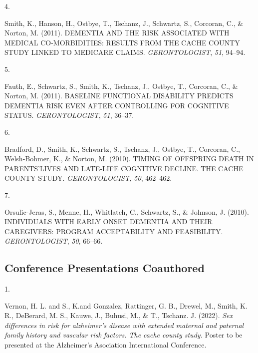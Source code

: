 \documentclass[11pt,a4paper,]{moderncv}
\newlength{\csllabelwidth}
\newcommand{\CSLLeftMargin}[1]{\parbox[t]{\csllabelwidth}{#1}}
\newcommand{\CSLRightInline}[1]{\parbox[t]{\linewidth - \csllabelwidth}{#1}}
\begin{document}
\leavevmode{}%
\CSLLeftMargin{4. }
\CSLRightInline{Smith, K., Hanson, H., Ostbye, T., Tschanz, J.,
Schwartz, S., Corcoran, C., \& Norton, M. (2011). DEMENTIA AND THE RISK
ASSOCIATED WITH MEDICAL CO-MORBIDITIES: RESULTS FROM THE CACHE COUNTY
STUDY LINKED TO MEDICARE CLAIMS. \emph{GERONTOLOGIST}, \emph{51},
94--94.}

\leavevmode{}%
\CSLLeftMargin{5. }
\CSLRightInline{Fauth, E., Schwartz, S., Smith, K., Tschanz, J., Ostbye,
T., Corcoran, C., \& Norton, M. (2011). BASELINE FUNCTIONAL DISABILITY
PREDICTS DEMENTIA RISK EVEN AFTER CONTROLLING FOR COGNITIVE STATUS.
\emph{GERONTOLOGIST}, \emph{51}, 36--37.}

\leavevmode{}%
\CSLLeftMargin{6. }
\CSLRightInline{Bradford, D., Smith, K., Schwartz, S., Tschanz, J.,
Ostbye, T., Corcoran, C., Welsh-Bohmer, K., \& Norton, M. (2010). TIMING
OF OFFSPRING DEATH IN PARENTS'LIVES AND LATE-LIFE COGNITIVE DECLINE. THE
CACHE COUNTY STUDY. \emph{GERONTOLOGIST}, \emph{50}, 462--462.}

\leavevmode{}%
\CSLLeftMargin{7. }
\CSLRightInline{Orsulic-Jeras, S., Menne, H., Whitlatch, C., Schwartz,
S., \& Johnson, J. (2010). INDIVIDUALS WITH EARLY ONSET DEMENTIA AND
THEIR CAREGIVERS: PROGRAM ACCEPTABILITY AND FEASIBILITY.
\emph{GERONTOLOGIST}, \emph{50}, 66--66.}

\vspace{7mm}

\hypertarget{conference-presentations-coauthored}{%
\subsection{\texorpdfstring{\textbf{Conference Presentations
Coauthored}}{Conference Presentations Coauthored}}\label{conference-presentations-coauthored}}

\hypertarget{refs_confco}{}
\leavevmode{}%
\CSLLeftMargin{1. }
\CSLRightInline{Vernon, H. L. and S., K.and Gonzalez, Rattinger, G. B.,
Drewel, M., Smith, K. R., DeBerard, M. S., Kauwe, J., Buhusi, M., \& T.,
Tschanz. J. (2022). \emph{Sex differences in risk for alzheimer's
disease with extended maternal and paternal family history and vascular
risk factors. The cache county study.} Poster to be presented at the
Alzheimer's Asociation International Conference.}
\end{document}
